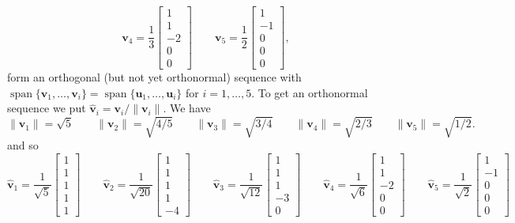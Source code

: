 \documentclass{amsart}
\newcommand{\spn}       {\operatorname{span}}
\newcommand{\bsm}       {\left[\begin{smallmatrix}}
\newcommand{\esm}       {\end{smallmatrix}\right]}
\newcommand{\vu}        {\mathbf{u}}
\newcommand{\vv}        {\mathbf{v}}
\newcommand{\hv}        {\widehat{\mathbf{v}}}
\renewcommand{\:}       {\colon}
\theoremstyle{definition}
\renewenvironment{solution}{\SolutionAtEnd}{\endSolutionAtEnd}
\begin{document}
\begin{solution}
\[    \vv_4 = \frac{1}{3}\bsm 1\\1\\-2\\0\\0\esm \hspace{2em}
    \vv_5 = \frac{1}{2}\bsm 1\\-1\\0\\0\\0\esm, 
 \]
 form an orthogonal (but not yet orthonormal) sequence with
 $\spn\{\vv_1,\dotsc,\vv_i\}=\spn\{\vu_1,\dotsc,\vu_i\}$ for
 $i=1,\dotsc,5$.  To get an orthonormal sequence we put
 $\hv_i=\vv_i/\|\vv_i\|$.  We have
 \[ \|\vv_1\| = \sqrt{5} \hspace{2em}
    \|\vv_2\| = \sqrt{4/5} \hspace{2em}
    \|\vv_3\| = \sqrt{3/4} \hspace{2em}
    \|\vv_4\| = \sqrt{2/3} \hspace{2em}
    \|\vv_5\| = \sqrt{1/2}.
 \]
 and so 
 \[
  \hv_1 = \frac{1}{\sqrt{5}}\bsm 1\\ 1\\ 1\\ 1\\ 1\esm \hspace{2em}
  \hv_2 = \frac{1}{\sqrt{20}}\bsm 1\\ 1\\ 1\\ 1\\ -4\esm \hspace{2em}
  \hv_3 = \frac{1}{\sqrt{12}}\bsm 1\\ 1\\ 1\\ -3 \\ 0\esm \hspace{2em}
  \hv_4 = \frac{1}{\sqrt{6}}\bsm 1\\ 1\\ -2 \\ 0 \\ 0 \esm \hspace{2em}
  \hv_5 = \frac{1}{\sqrt{2}}\bsm 1\\ -1\\ 0\\ 0\\ 0\esm
 \]
\end{solution}
\end{document}
